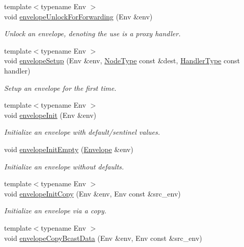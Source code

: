 \begin{DoxyCompactItemize}
{\footnotesize template$<$typename Env $>$ }\\void \hyperlink{namespacevt_af3b1b3751353bac014e08070383062e9}{envelope\+Unlock\+For\+Forwarding} (Env \&env)
\begin{DoxyCompactList}\small\item\em Unlock an envelope, denoting the use is a proxy handler. \end{DoxyCompactList}\item 
{\footnotesize template$<$typename Env $>$ }\\void \hyperlink{namespacevt_a28259c2647b43612398b9355a3e1916c}{envelope\+Setup} (Env \&env, \hyperlink{namespacevt_a866da9d0efc19c0a1ce79e9e492f47e2}{Node\+Type} const \&dest, \hyperlink{namespacevt_af64846b57dfcaf104da3ef6967917573}{Handler\+Type} const handler)
\begin{DoxyCompactList}\small\item\em Setup an envelope for the first time. \end{DoxyCompactList}\item 
{\footnotesize template$<$typename Env $>$ }\\void \hyperlink{namespacevt_a26b669aa49c2c9fa4a0fb88902518adb}{envelope\+Init} (Env \&env)
\begin{DoxyCompactList}\small\item\em Initialize an envelope with default/sentinel values. \end{DoxyCompactList}\item 
void \hyperlink{namespacevt_a2594d3d4a1f40c4db73713a8b62b24df}{envelope\+Init\+Empty} (\hyperlink{namespacevt_aa9c8cc094b5361482021d63012987814}{Envelope} \&env)
\begin{DoxyCompactList}\small\item\em Initialize an envelope without defaults. \end{DoxyCompactList}\item 
{\footnotesize template$<$typename Env $>$ }\\void \hyperlink{namespacevt_a931b61a10a85d44d2355e984e40177ff}{envelope\+Init\+Copy} (Env \&env, Env const \&src\+\_\+env)
\begin{DoxyCompactList}\small\item\em Initialize an envelope via a copy. \end{DoxyCompactList}\item 
{\footnotesize template$<$typename Env $>$ }\\void \hyperlink{namespacevt_a16caa74ca477155c59de62474b2e1f89}{envelope\+Copy\+Bcast\+Data} (Env \&env, Env const \&src\+\_\+env)

\end{DoxyCompactItemize}
